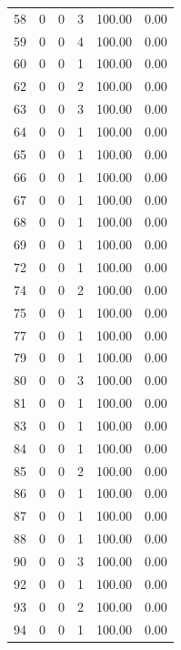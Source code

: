 \documentclass[11pt]{article}
\begin{document}
\begin{longtable}{r|r|r|r|r|r}
    58    & 0     & 0     & 3     & 100.00 & 0.00 \\
    59    & 0     & 0     & 4     & 100.00 & 0.00 \\
    60    & 0     & 0     & 1     & 100.00 & 0.00 \\
    62    & 0     & 0     & 2     & 100.00 & 0.00 \\
    63    & 0     & 0     & 3     & 100.00 & 0.00 \\
    64    & 0     & 0     & 1     & 100.00 & 0.00 \\
    65    & 0     & 0     & 1     & 100.00 & 0.00 \\
    66    & 0     & 0     & 1     & 100.00 & 0.00 \\
    67    & 0     & 0     & 1     & 100.00 & 0.00 \\
    68    & 0     & 0     & 1     & 100.00 & 0.00 \\
    69    & 0     & 0     & 1     & 100.00 & 0.00 \\
    72    & 0     & 0     & 1     & 100.00 & 0.00 \\
    74    & 0     & 0     & 2     & 100.00 & 0.00 \\
    75    & 0     & 0     & 1     & 100.00 & 0.00 \\
    77    & 0     & 0     & 1     & 100.00 & 0.00 \\
    79    & 0     & 0     & 1     & 100.00 & 0.00 \\
    80    & 0     & 0     & 3     & 100.00 & 0.00 \\
    81    & 0     & 0     & 1     & 100.00 & 0.00 \\
    83    & 0     & 0     & 1     & 100.00 & 0.00 \\
    84    & 0     & 0     & 1     & 100.00 & 0.00 \\
    85    & 0     & 0     & 2     & 100.00 & 0.00 \\
    86    & 0     & 0     & 1     & 100.00 & 0.00 \\
    87    & 0     & 0     & 1     & 100.00 & 0.00 \\
    88    & 0     & 0     & 1     & 100.00 & 0.00 \\
    90    & 0     & 0     & 3     & 100.00 & 0.00 \\
    92    & 0     & 0     & 1     & 100.00 & 0.00 \\
    93    & 0     & 0     & 2     & 100.00 & 0.00 \\
    94    & 0     & 0     & 1     & 100.00 & 0.00 \\

\end{longtable}
\end{document}
